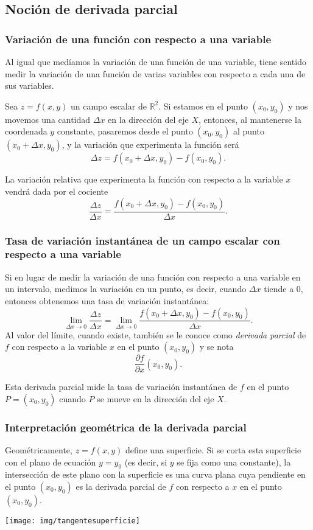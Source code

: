 \subsection{Noción de derivada parcial}
\begin{frame}
\frametitle{Variación de una función con respecto a una variable}
Al igual que medíamos la variación de una función de una variable, tiene sentido medir la variación de una función de
varias variables con respecto a cada una de sus variables.

Sea $z=f(x,y)$ un campo escalar de $\mathbb{R}^2$.
Si estamos en el punto $(x_0,y_0)$ y nos movemos una cantidad $\Delta x$ en la dirección del eje $X$, entonces, al
mantenerse la coordenada $y$ constante, pasaremos desde el punto $(x_0,y_0)$ al punto $(x_0+\Delta x,y_0)$, y la
variación que experimenta la función será
\[
\Delta z=f(x_0+\Delta x,y_0)-f (x_0,y_0).
\]

La variación relativa que experimenta la función con respecto a la variable $x$ vendrá dada por el cociente 
\[\frac{\Delta z}{\Delta x}=\frac{f(x_0+\Delta x,y_0)-f(x_0,y_0)}{\Delta x}.\]
\end{frame}


\begin{frame}
\frametitle{Tasa de variación instantánea de un campo escalar con respecto a una variable}
Si en lugar de medir la variación de una función con respecto a una variable en un intervalo, medimos la variación en un
punto, es decir, cuando $\Delta x$ tiende a 0, entonces obtenemos una tasa de variación instantánea:
\[
\lim_{\Delta x\rightarrow 0}\frac{\Delta z}{\Delta x}=\lim_{\Delta x \rightarrow 0}\frac{f(x_0+\Delta x,y_0)-f(x_0,y_0)}{\Delta x}.
\]
Al valor del límite, cuando existe, también se le conoce como \emph{derivada parcial} de $f$ con respecto a la variable $x$ en el punto $(x_0,y_0)$ y se nota
\[
\frac{\partial f}{\partial x}(x_0,y_0).
\]

Esta derivada parcial mide la tasa de variación instantánea de $f$ en el punto $P=(x_0,y_0)$ cuando $P$ se mueve en la dirección del eje $X$.
\end{frame}


\begin{frame}
\frametitle{Interpretación geométrica de la derivada parcial}
Geométricamente, $z=f(x,y)$ define una superficie. Si se corta esta superficie con el plano de ecuación $y=y_0$ (es
decir, si $y$ se fija como una constante), la intersección de este plano con la superficie es una curva plana cuya
pendiente en el punto $(x_0,y_0)$ es la derivada parcial de $f$ con respecto a $x$ en el punto $(x_0,y_0)$.

\begin{center}
\texttt{[image: img/tangentesuperficie]}
\end{center}
\end{frame}



